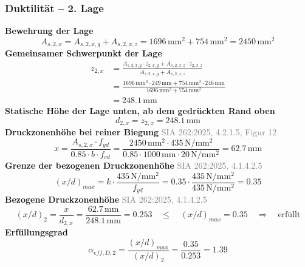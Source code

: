 \documentclass[11pt,a4paper]{article}
\newcommand{\normref}[1]{{\small\textcolor{gray}{#1}}}
\begin{document}
\subsubsection{Duktilität – 2. Lage}
\noindent\textbf{Bewehrung der Lage}
\begin{equation*}
A_{s,2,x} = A_{s,2,x,g} + A_{s,2,x,z} = 1696\,\mathrm{mm}^{2} + 754\,\mathrm{mm}^{2} = 2450\,\mathrm{mm}^{2}
\end{equation*}
\noindent\textbf{Gemeinsamer Schwerpunkt der Lage}
\begin{equation*}
\begin{aligned}
  z_{2,x} &= \frac{A_{s,2,x,g} \cdot z_{2,x,g} + A_{s,2,x,z} \cdot z_{2,x,z}}{A_{s,2,x,g} + A_{s,2,x,z}} \\
  &= \frac{1696\,\mathrm{mm}^{2} \cdot 249\,\mathrm{mm} + 754\,\mathrm{mm}^{2} \cdot 246\,\mathrm{mm}}{1696\,\mathrm{mm}^{2} + 754\,\mathrm{mm}^{2}} \\
  &= 248.1\,\mathrm{mm}
\end{aligned}
\end{equation*}
\noindent\textbf{Statische Höhe der Lage unten, ab dem gedrückten Rand oben}
\begin{equation*}
d_{2,x} = z_{2,x} = 248.1\,\mathrm{mm}
\end{equation*}
\noindent\textbf{Druckzonenhöhe bei reiner Biegung} \hfill \normref{SIA 262:2025, 4.2.1.5, Figur 12}
\begin{equation*}
x = \frac{A_{s,2,x} \cdot f_{yd}}{0.85 \cdot b \cdot f_{cd}} = \frac{2450\,\mathrm{mm}^{2} \cdot 435\,\mathrm{N}/\mathrm{mm}^{2}}{0.85 \cdot 1000\,\mathrm{mm} \cdot 20\,\mathrm{N}/\mathrm{mm}^{2}} = 62.7\,\mathrm{mm}
\end{equation*}
\noindent\textbf{Grenze der bezogenen Druckzonenhöhe} \hfill \normref{SIA 262:2025, 4.1.4.2.5}
\begin{equation*}
\left(x/d\right)_{max} = k \cdot \frac{435\,\mathrm{N/mm^2}}{f_{yd}} = 0.35 \cdot \frac{435\,\mathrm{N/mm^2}}{435\,\mathrm{N}/\mathrm{mm}^{2}} = 0.35
\end{equation*}
\noindent\textbf{Bezogene Druckzonenhöhe} \hfill \normref{SIA 262:2025, 4.1.4.2.5}
\begin{equation*}
\left(x/d\right)_{2} = \frac{x}{d_{2,x}} = \frac{62.7\,\mathrm{mm}}{248.1\,\mathrm{mm}} = 0.253 \quad \le \quad \left(x/d\right)_{max} = 0.35 \quad \Rightarrow \quad \text{erfüllt}
\end{equation*}
\noindent\textbf{Erfüllungsgrad}
\begin{equation*}
\alpha_{eff,D,2} = \frac{\left(x/d\right)_{max}}{\left(x/d\right)_{2}} = \frac{0.35}{0.253} = 1.39
\end{equation*}
\end{document}

